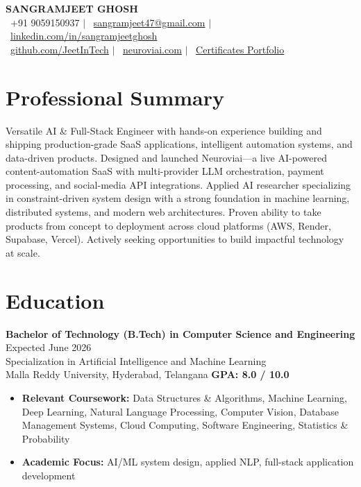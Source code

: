 \documentclass[11pt]{article}
\begin{document}
\begin{center}
{\LARGE \textbf{SANGRAMJEET GHOSH}} \\[6pt]
{\normalsize
\faPhone\ +91 9059150937 \quad $|$ \quad
\faEnvelope\ \href{mailto:sangramjeet47@gmail.com}{sangramjeet47@gmail.com} \quad $|$ \quad
\faLinkedin\ \href{https://www.linkedin.com/in/sangramjeetghosh}{linkedin.com/in/sangramjeetghosh}
}\\[2pt]
{\normalsize
\faGithub\ \href{https://github.com/JeetInTech}{github.com/JeetInTech} \quad $|$ \quad
\faGlobe\ \href{https://neuroviai.com}{neuroviai.com} \quad $|$ \quad
\faFolder\ \href{https://drive.google.com/drive/folders/1ZQd-DeX-rXlEVDTwDJfjLjnG7iPc_fEw}{Certificates Portfolio}
}
\end{center}

\vspace{2pt}

\section*{Professional Summary}

Versatile AI \& Full-Stack Engineer with hands-on experience building and shipping production-grade SaaS applications, intelligent automation systems, and data-driven products. Designed and launched Neuroviai—a live AI-powered content-automation SaaS with multi-provider LLM orchestration, payment processing, and social-media API integrations. Applied AI researcher specializing in constraint-driven system design with a strong foundation in machine learning, distributed systems, and modern web architectures. Proven ability to take products from concept to deployment across cloud platforms (AWS, Render, Supabase, Vercel). Actively seeking opportunities to build impactful technology at scale.

\section*{Education}

\textbf{Bachelor of Technology (B.Tech) in Computer Science and Engineering} \hfill Expected June 2026 \\
Specialization in Artificial Intelligence and Machine Learning \\
Malla Reddy University, Hyderabad, Telangana \hfill \textbf{GPA: 8.0 / 10.0}


\begin{itemize}
\item \textbf{Relevant Coursework:} Data Structures \& Algorithms, Machine Learning, Deep Learning, Natural Language Processing, Computer Vision, Database Management Systems, Cloud Computing, Software Engineering, Statistics \& Probability
\item \textbf{Academic Focus:} AI/ML system design, applied NLP, full-stack application development
\end{itemize}
\end{document}
